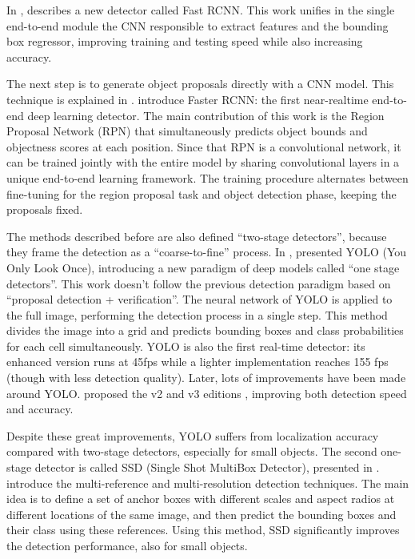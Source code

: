  In \cite{fastrcnn}, \citeauthor{fastrcnn} describes a new detector called Fast RCNN. This work unifies in the single end-to-end module the CNN responsible to extract features and the bounding box regressor, improving training and testing speed while also increasing accuracy. 
 
 The next step is to generate object proposals directly with a CNN model. This technique is explained in \cite{fasterrcnn}. \citeauthor{fasterrcnn} introduce Faster RCNN: the first near-realtime
 end-to-end deep learning detector. The main contribution of this work is the Region Proposal Network (RPN) that simultaneously predicts object bounds and objectness scores at each position. Since that RPN is a convolutional network, it can be trained jointly with the entire model by sharing convolutional layers in a unique end-to-end learning framework. The training procedure alternates between fine-tuning for the region proposal task and object detection phase, keeping the proposals fixed. 
 
 The methods described before are also defined ``two-stage detectors'', because they frame the detection as a ``coarse-to-fine'' process. In \cite{yolo}, \citeauthor{yolo} presented YOLO (You Only Look Once), introducing a new paradigm of deep models called ``one stage detectors''. This work doesn't follow the previous detection paradigm based on ``proposal detection + verification''. The neural network of YOLO is applied to the full image, performing the detection process in a single step. This method divides the image into a grid and predicts bounding boxes and class probabilities for each cell simultaneously. YOLO is also the first real-time detector: its enhanced version runs
 at 45fps while a lighter implementation reaches 155 fps (though with less detection quality).  Later, lots of improvements have been made around YOLO. \citeauthor{yolov2} proposed the v2 and v3 editions \cite{yolov2, yolov3}, improving both detection speed and accuracy. 
 
 Despite these great improvements, YOLO suffers from localization accuracy compared with two-stage detectors, especially for small objects. The second one-stage detector is called SSD (Single Shot MultiBox Detector), presented in \cite{ssd}. \citeauthor{ssd} introduce the multi-reference and multi-resolution detection techniques. The main idea is to define a set of anchor boxes with different scales and aspect radios at different locations of the same image, and then predict the bounding boxes and their class using these references. Using this method, SSD significantly improves the detection performance, also for small objects. 
 
